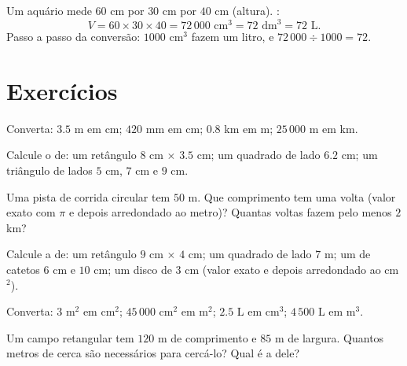 \begin{example}\label{ex:g6:measure:aquarium}
Um aquário mede $60$ cm por $30$ cm por $40$ cm (altura). :
\[
V = 60 \times 30 \times 40 = 72\,000 \text{ cm}^3 = 72 \text{ dm}^3
= 72 \text{ L}.
\]
Passo a passo da conversão: $1000$ cm$^3$ fazem um litro, e
$72\,000 \div 1000 = 72$.
\end{example}

\section{Exercícios}

\begin{exercise}[$\star$]\label{exo:g6:measure:1}
Converta: $3.5$ m em cm; $420$ mm em cm; $0.8$ km em m;
$25\,000$ m em km.
\end{exercise}

\begin{exercise}[$\star$]\label{exo:g6:measure:2}
Calcule o  de: um retângulo $8$ cm $\times$ $3.5$ cm; um
quadrado de lado $6.2$ cm; um triângulo de lados $5$ cm, $7$ cm e
$9$ cm.
\end{exercise}

\begin{exercise}[$\star$]\label{exo:g6:measure:3}
Uma pista de corrida circular tem  $50$ m. Que comprimento tem uma
volta (valor exato com $\pi$ e depois arredondado ao metro)? Quantas
voltas fazem pelo menos $2$ km?
\end{exercise}

\begin{exercise}[$\star$]\label{exo:g6:measure:4}
Calcule a  de: um retângulo $9$ cm $\times$ $4$ cm; um quadrado de
lado $7$ m; um  de catetos $6$ cm e $10$ cm; um
disco de  $3$ cm (valor exato e depois arredondado ao cm$^2$).
\end{exercise}

\begin{exercise}[$\star$]\label{exo:g6:measure:5}
Converta: $3$ m$^2$ em cm$^2$; $45\,000$ cm$^2$ em m$^2$; $2.5$ L em
cm$^3$; $4\,500$ L em m$^3$.
\end{exercise}

\begin{exercise}[$\star$]\label{exo:g6:measure:6}
Um campo retangular tem $120$ m de comprimento e $85$ m de largura.
Quantos metros de cerca são necessários para cercá-lo? Qual é a 
dele?
\end{exercise}

